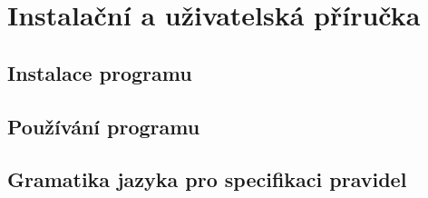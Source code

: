 \chapter{Instalační a uživatelská příručka}

\section{Instalace programu}

\section{Používání programu}

\section{Gramatika jazyka pro specifikaci pravidel}
\label{avd_grammar}

